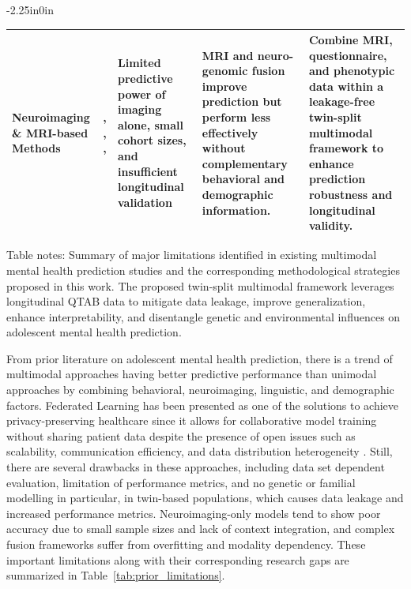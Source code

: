 \documentclass[10pt,letterpaper]{article}
\newcommand{\hlpar}[1]{\leavevmode\colorbox{yellow!30}{\parbox{\dimexpr\linewidth-2\fboxsep\relax}{#1}}\vspace{2pt}}
\begin{document}
\begin{table}[!t]
\begin{adjustwidth}{-2.25in}{0in}
\begin{tabular}{|p{2.5cm}|p{1.8cm}|p{3.5cm}|p{4.2cm}|p{4.5cm}|}
Neuroimaging \& MRI-based Methods
& \cite{ref23}, \cite{ref24}, \cite{ref25}, \cite{ref27}
& Limited predictive power of imaging alone, small cohort sizes, and insufficient longitudinal validation
& MRI and neuro-genomic fusion improve prediction but perform less effectively without complementary behavioral and demographic information.
& Combine MRI, questionnaire, and phenotypic data within a leakage-free twin-split multimodal framework to enhance prediction robustness and longitudinal validity. \\
\hline

\end{tabular}

\begin{flushleft}
\hlpar{Table notes: Summary of major limitations identified in existing multimodal mental health prediction studies and the corresponding methodological strategies proposed in this work. The proposed twin-split multimodal framework leverages longitudinal QTAB data to mitigate data leakage, improve generalization, enhance interpretability, and disentangle genetic and environmental influences on adolescent mental health prediction.}
\end{flushleft}

\end{adjustwidth}
\end{table}

From prior literature on adolescent mental health prediction, there is a trend of multimodal approaches having better predictive performance than unimodal approaches by combining behavioral, neuroimaging, linguistic, and demographic factors. Federated Learning has been presented as one of the solutions to achieve privacy-preserving healthcare since it allows for collaborative model training without sharing patient data despite the presence of open issues such as scalability, communication efficiency, and data distribution heterogeneity \cite{ref66}. Still, there are several drawbacks in these approaches, including data set dependent evaluation, limitation of performance metrics, and no genetic or familial modelling in particular, in twin-based populations, which causes data leakage and increased performance metrics. Neuroimaging-only models tend to show poor accuracy due to small sample sizes and lack of context integration, and complex fusion frameworks suffer from overfitting and modality dependency. These important limitations along with their corresponding research gaps are summarized in Table~\ref{tab:prior_limitations}.
\end{document}
